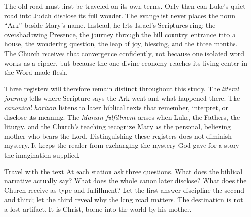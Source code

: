 The old road must first be traveled on its own terms.  Only then can Luke's
quiet road into Judah disclose its full wonder.  The evangelist never places
the noun ``Ark'' beside Mary's name.  Instead, he lets Israel's Scriptures ring:
the overshadowing Presence, the journey through the hill country, entrance
into a house, the wondering question, the leap of joy, blessing, and the three
months.  The Church receives that convergence confidently, not because one
isolated word works as a cipher, but because the one divine economy reaches its
living center in the Word made flesh.

Three registers will therefore remain distinct throughout this study.  The
\emph{literal journey} tells where Scripture says the Ark went and what
happened there.  The \emph{canonical horizon} listens to later biblical texts
that remember, interpret, or disclose its meaning.  The \emph{Marian
fulfillment} arises when Luke, the Fathers, the liturgy, and the Church's
teaching recognize Mary as the personal, believing mother who bears the Lord.
Distinguishing these registers does not diminish mystery.  It keeps the reader
from exchanging the mystery God gave for a story the imagination supplied.

\begin{studybox}{Travel with the text}
At each station ask three questions.  What does the biblical narrative
actually say?  What does the whole canon later disclose?  What does the Church
receive as type and fulfillment?  Let the first answer discipline the second
and third; let the third reveal why the long road matters.  The destination is
not a lost artifact.  It is Christ, borne into the world by his mother.
\end{studybox}
